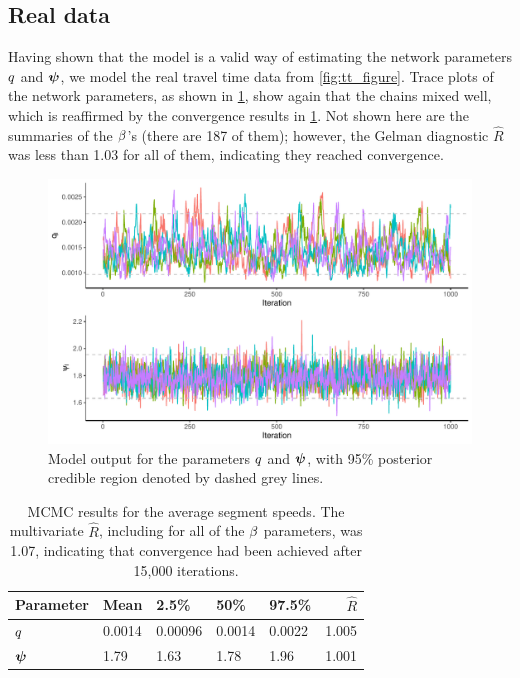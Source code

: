 \subsection{Real data}
\label{nw_par_est_real}



Having shown that the  model is a valid way of estimating the network parameters $\NWnoise$ and $\NWvar$, we model the real travel time data from \cref{fig:tt_figure}. Trace plots of the network parameters, as shown in \cref{fig:nw_model_n1_view}, show again that the chains mixed well, which is reaffirmed by the convergence results in \cref{tab:nw_model_fit_smry}. Not shown here are the summaries of the $\beta$'s (there are 187 of them); however, the Gelman diagnostic $\hat R$ was less than 1.03 for all of them, indicating they reached convergence.

\begin{knitrout}\small
{}\color{fgcolor}\begin{figure}

{\centering \includegraphics[width=0.8\linewidth]{figure/nw_model_n1_view-1} 

}

\caption[Model output for the parameters $\NWnoise$ and $\NWvar$, with 95\% posterior credible region denoted by dashed grey lines]{Model output for the parameters $\NWnoise$ and $\NWvar$, with 95\% posterior credible region denoted by dashed grey lines.}\label{fig:nw_model_n1_view}
\end{figure}


\end{knitrout}

\begin{table}

\caption{\label{tab:nw_model_fit_smry}MCMC results for the average segment speeds. The multivariate $\hat R$, including for all of the $\beta$ parameters, was 1.07, indicating that convergence had been achieved after 15,000 iterations.}
\centering
\begin{tabular}[b]{lllllr}
\toprule
Parameter & Mean & 2.5\% & 50\% & 97.5\% & $\hat R$\\
\midrule
$\NWnoise$ & 0.0014 & 0.00096 & 0.0014 & 0.0022 & 1.005\\
$\NWvar$ & 1.79 & 1.63 & 1.78 & 1.96 & 1.001\\
\bottomrule
\end{tabular}
\end{table}



